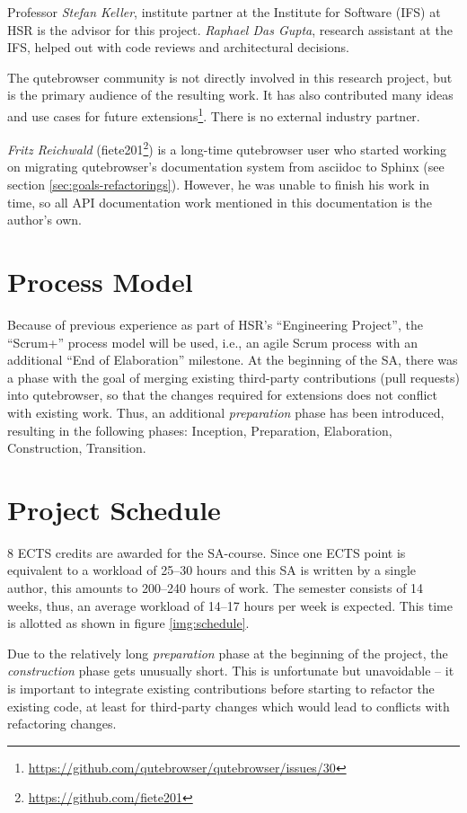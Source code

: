 Professor \emph{Stefan Keller}, institute partner at the Institute for Software
(IFS) at HSR is the advisor for this project. \emph{Raphael Das Gupta}, research
assistant at the IFS, helped out with code reviews and architectural decisions.

The qutebrowser community is not directly involved in this research project, but
is the primary audience of the resulting work. It has also contributed many
ideas and use cases for future
extensions\footnote{\url{https://github.com/qutebrowser/qutebrowser/issues/30}}.
There is no external industry partner.

\label{fiete}
\emph{Fritz Reichwald} (fiete201\footnote{\url{https://github.com/fiete201}})
is a long-time qutebrowser user who started working on migrating qutebrowser's
documentation system from asciidoc to Sphinx (see section
\ref{sec:goals-refactorings}). However, he was unable to finish his work in
time, so all API documentation work mentioned in this documentation is the
author's own.

\section{Process Model}
Because of previous experience as part of HSR's ``Engineering Project'', the
``Scrum+'' process model will be used, i.e., an agile Scrum process with an
additional ``End of Elaboration'' milestone. At the beginning of the SA, there was a phase with the goal of merging existing
third-party contributions (pull requests) into qutebrowser, so that the changes
required for extensions does not conflict with existing work. Thus, an additional
\emph{preparation} phase has been introduced, resulting in the following phases:
Inception, Preparation, Elaboration, Construction, Transition.

\section{Project Schedule}
\label{schedule}

8 ECTS credits are awarded for the SA-course. Since one ECTS point is equivalent
to a workload of 25--30 hours \autocite{ects} and this SA is written by a single
author, this amounts to 200--240 hours of work. The semester consists of 14
weeks, thus, an average workload of 14--17 hours per week is expected. This time
is allotted as shown in figure \ref{img:schedule}.

Due to the relatively long \emph{preparation} phase at the beginning of the
project, the \emph{construction} phase gets unusually short. This is
unfortunate but unavoidable -- it is important to integrate existing
contributions before starting to refactor the existing code, at least for
third-party changes which would lead to conflicts with refactoring changes.

